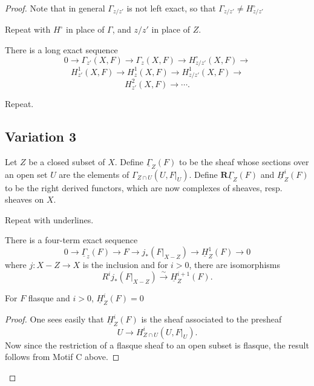 \begin{proof}
Note that in general \(\Gamma_{z/z'}\) is not left exact, so that \(\Gamma_{z/z'} \ne H_{z/z'}^{\circ}\)

\begin{motif}
Repeat with \(H^{\circ}\) in place of \(\Gamma\), and \(z / z'\) in place of \(Z\).
\end{motif}

\begin{motif}
There is a long exact sequence 
\[0 \to \Gamma_{z'}(X, F) \to \Gamma_{z}(X, F) \to H_{z/z'}^{\circ}(X, F) \to\]
\[H_{z'}^{1}(X, F) \to H_{z}^{1}(X, F) \to H_{z/z'}^{1}(X, F) \to\]
\[H_{z'}^{2}(X, F) \to \cdots .\]
\end{motif}

\begin{motif}
Repeat.
\end{motif}

\setcounter{page}{220}
\subsection{Variation 3}
Let \(Z\) be a closed subset of \(X\). Define \(\underline{\Gamma}_{Z}(F)\) to be the sheaf whose sections over an open set \(U\) are the elements of \(\Gamma_{Z \cap U}(U,F|_{U})\).
Define \(\mathbf{R}\underline{\Gamma}_{Z}(F)\) and \(\underline{H}_{Z}^{i}(F)\) to be the right derived functors, which are now complexes of sheaves, resp. sheaves on \(X\).

\begin{motif}
Repeat with underlines.
\end{motif}

\begin{motif}
There is a four-term exact sequence 
\[0 \to \underline{\Gamma}_{z}(F) \to F \to j_{*}\left(\left.F\right|_{X-Z}\right) \to \underline{H}_{Z}^{1}(F) \to 0\]
where \(j: X-Z \to X\) is the inclusion and for \(i>0\), there are isomorphisms 
\[R^{i} j_{*}\left(\left.F\right|_{X-Z}\right) \stackrel{\sim}{\to} \underline{H}_{Z}^{i+1}(F) .\]
\end{motif}

\begin{motif}
For \(F\) flasque and \(i>0\), \(\underline{H}_{Z}^{i}(F)=0\)
\end{motif}
\begin{proof}
One sees easily that \(\underline{H}_{Z}^{i}(F)\) is the sheaf associated to the presheaf 
\[U \to H_{Z \cap U}^{i}\left(U,\left.F\right|_{U}\right) .\]
Now since the restriction of a flasque sheaf to an open subset is flasque, the result follows from Motif C above.
\end{proof}


\end{proof}
